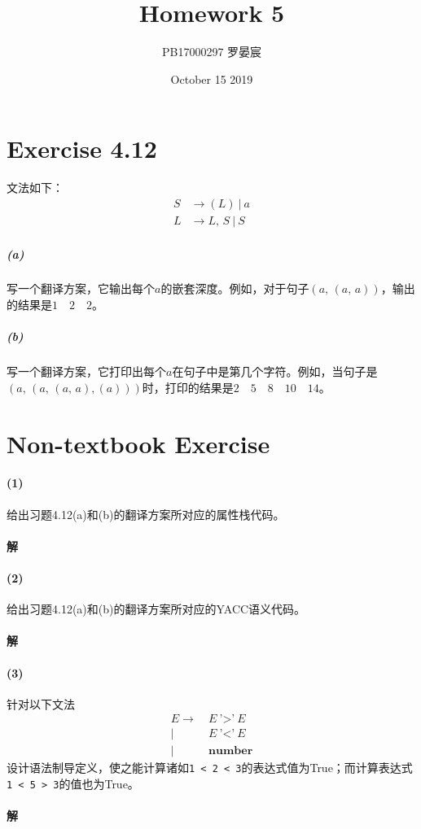 \documentclass{article}
\title{Homework 5}
\author{PB17000297 罗晏宸}
\date{October 15 2019}
\begin{document}
\maketitle

\section{Exercise 4.12}
文法如下：
\begin{align*}
    S &\rightarrow (L)\ |\ a \\
    L &\rightarrow L,\,S\ |\ S
\end{align*}
\subparagraph{(a)}
写一个翻译方案，它输出每个$a$的嵌套深度。例如，对于句子$(a,\,(a,\,a))$，输出的结果是$1\quad2\quad2$。
\subparagraph{(b)}
写一个翻译方案，它打印出每个$a$在句子中是第几个字符。例如，当句子是$(a,\,(a,\,(a,\,a),(a)))$时，打印的结果是$2\quad5\quad8\quad10\quad14$。
\\
\section{Non-textbook Exercise}
\paragraph{(1)}
给出习题4.12(a)和(b)的翻译方案所对应的属性栈代码。
\\
\paragraph{解}


\paragraph{(2)}
给出习题4.12(a)和(b)的翻译方案所对应的YACC语义代码。
\\
\paragraph{解}

\paragraph{(3)}
针对以下文法
\begin{align*}
    E \rightarrow &\ E\ \texttt{'>'}\ E \\
    |&\  E\ \texttt{'<'}\ E \\
    |&\  \textbf{number}
\end{align*}
设计语法制导定义，使之能计算诸如\texttt{1 < 2 < 3}的表达式值为True；而计算表达式\texttt{1 < 5 > 3}的值也为True。
\\
\paragraph{解}
\end{document}
